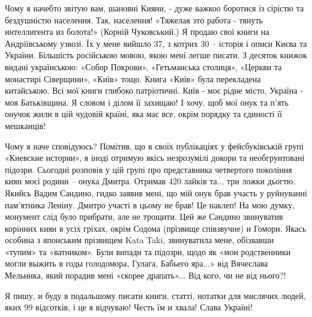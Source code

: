 Чому я начебто звітую вам, шановні Кияни, - дуже важкоо боротися із сірістю та
бездушністю населення. Так, населення! «Тяжелая это работа -  тянуть
интеллигента из болота!» (Корній Чуковський.) Я продаю свої книги на
Андріївському узвозі. Їх у мене вийшло 37, з котрих 30 – історія і описи Києва
та України. Більшість російською мовою, якою мені легше писати. З десяток книжок
видані українською: «Собор Покрови», «Гетьманська столиця», «Церкви та
монастирі Сіверщини», «Київ» тощо. Книга «Київ» була перекладена китайською.
Всі мої книги глибоко патріотичні. Київ - моє рідне місто, Україна - моя
Батьківщина. Я словом і ділом її захищаю! І хочу, щоб мої онук та п'ять онучок
жили в цій чудовій країні, яка має все, окрім порядку та єдиності її мешканців!

Чому я наче сповідуюсь? Помітив, що в своїх публікаціях у фейсбуківській групі
«Киевские истории», я іноді отримую якісь незрозумілі докори та необгрунтовані
підозри. Сьогодні розповів у цій групі про представника четвертого покоління
киян моєї родини – онука Дмитра. Отримав 420 лайків та... три ложки дьогтю.
Якийсь Вадим Сандино, гидко заявив мені, що мій онук брав участь у руйнуванні
пам'ятника Леніну. Дмитро участі в цьому не брав! Це наклеп! На мою думку,
монумент слід було прибрати, але не трощити. Цей же Сандино звинуватив корінних
киян в усіх гріхах, окрім Содома (прізвище співзвучне) и Гомори. Якась особина
з японським прізвищем Kata Taki, звинуватила мене, обізвавши «тупим» та
«ватником». Були випади та підозри, щодо як «мои родственники могли выжить в
годы голодомора, Гулага, Бабьего яра...» від Вячеслава Мельника, який порадив
мені «скорее драпать»... Від кого, чи не від нього?!

Я пишу, и буду в подальшому писати книги, статті, нотатки для мислячих людей,
яких 99 відсотків, і це я відчуваю! Честь їм и хвала! Слава Україні!

